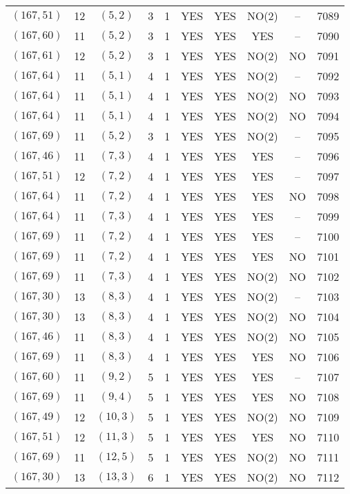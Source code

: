 \begin{longtable}{|c|c|c|c|c|c|c|c|c|c|}
$(167, 51)$ & 12 & $(5, 2)$ & 3 & 1 & YES & YES & NO(2) & -- & 7089\\
$(167, 60)$ & 11 & $(5, 2)$ & 3 & 1 & YES & YES & YES & -- & 7090\\
$(167, 61)$ & 12 & $(5, 2)$ & 3 & 1 & YES & YES & NO(2) & NO & 7091\\
$(167, 64)$ & 11 & $(5, 1)$ & 4 & 1 & YES & YES & NO(2) & -- & 7092\\
$(167, 64)$ & 11 & $(5, 1)$ & 4 & 1 & YES & YES & NO(2) & NO & 7093\\
$(167, 64)$ & 11 & $(5, 1)$ & 4 & 1 & YES & YES & NO(2) & NO & 7094\\
$(167, 69)$ & 11 & $(5, 2)$ & 3 & 1 & YES & YES & NO(2) & -- & 7095\\
$(167, 46)$ & 11 & $(7, 3)$ & 4 & 1 & YES & YES & YES & -- & 7096\\
$(167, 51)$ & 12 & $(7, 2)$ & 4 & 1 & YES & YES & YES & -- & 7097\\
$(167, 64)$ & 11 & $(7, 2)$ & 4 & 1 & YES & YES & YES & NO & 7098\\
$(167, 64)$ & 11 & $(7, 3)$ & 4 & 1 & YES & YES & YES & -- & 7099\\
$(167, 69)$ & 11 & $(7, 2)$ & 4 & 1 & YES & YES & YES & -- & 7100\\
$(167, 69)$ & 11 & $(7, 2)$ & 4 & 1 & YES & YES & YES & NO & 7101\\
$(167, 69)$ & 11 & $(7, 3)$ & 4 & 1 & YES & YES & NO(2) & NO & 7102\\
$(167, 30)$ & 13 & $(8, 3)$ & 4 & 1 & YES & YES & NO(2) & -- & 7103\\
$(167, 30)$ & 13 & $(8, 3)$ & 4 & 1 & YES & YES & NO(2) & NO & 7104\\
$(167, 46)$ & 11 & $(8, 3)$ & 4 & 1 & YES & YES & NO(2) & NO & 7105\\
$(167, 69)$ & 11 & $(8, 3)$ & 4 & 1 & YES & YES & YES & NO & 7106\\
$(167, 60)$ & 11 & $(9, 2)$ & 5 & 1 & YES & YES & YES & -- & 7107\\
$(167, 69)$ & 11 & $(9, 4)$ & 5 & 1 & YES & YES & YES & NO & 7108\\
$(167, 49)$ & 12 & $(10, 3)$ & 5 & 1 & YES & YES & NO(2) & NO & 7109\\
$(167, 51)$ & 12 & $(11, 3)$ & 5 & 1 & YES & YES & YES & NO & 7110\\
$(167, 69)$ & 11 & $(12, 5)$ & 5 & 1 & YES & YES & NO(2) & NO & 7111\\
$(167, 30)$ & 13 & $(13, 3)$ & 6 & 1 & YES & YES & NO(2) & NO & 7112\\

\end{longtable}
